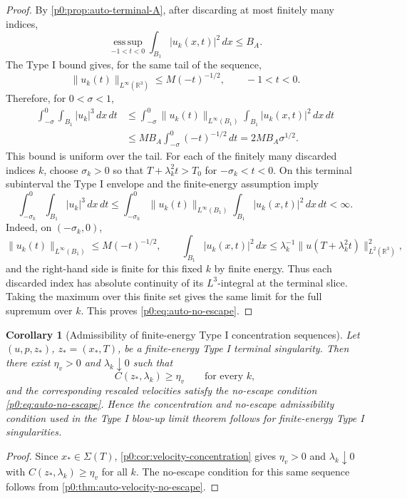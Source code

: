 \documentclass[11pt]{amsart}
\theoremstyle{plain}
\newtheorem{corollary}[corollary]{Corollary}
\theoremstyle{definition}
\theoremstyle{remark}
\numberwithin{equation}{section}
\begin{document}
\begin{proof}
By \cref{p0:prop:auto-terminal-A}, after discarding at most finitely many indices,
\[
  \operatorname*{ess\,sup}_{-1<t<0}\int_{B_1}|u_k(x,t)|^2\,dx\le B_A .
\]
The Type I bound gives, for the same tail of the sequence,
\[
  \|u_k(t)\|_{L^\infty(\mathbb R^3)}
  \le M(-t)^{-1/2},
  \qquad -1<t<0 .
\]
Therefore, for \(0<\sigma<1\),
\[
\begin{aligned}
  \int_{-\sigma}^{0}\int_{B_1}|u_k|^3\,dx\,dt
  &\le
  \int_{-\sigma}^{0}\|u_k(t)\|_{L^\infty(B_1)}
       \int_{B_1}|u_k(x,t)|^2\,dx\,dt  \\
  &\le M B_A\int_{-\sigma}^{0}(-t)^{-1/2}\,dt
   =2M B_A\sigma^{1/2} .
\end{aligned}
\]
This bound is uniform over the tail.  For each of the finitely many discarded
indices \(k\), choose \(\sigma_k>0\) so that
\(T+\lambda_k^2t>T_0\) for \(-\sigma_k<t<0\).  On this terminal subinterval
the Type I envelope and the finite-energy assumption imply
\[
  \int_{-\sigma_k}^{0}\int_{B_1}|u_k|^3\,dx\,dt
  \le
  \int_{-\sigma_k}^{0}\|u_k(t)\|_{L^\infty(B_1)}
       \int_{B_1}|u_k(x,t)|^2\,dx\,dt
  <\infty .
\]
Indeed, on \((-\sigma_k,0)\),
\[
  \|u_k(t)\|_{L^\infty(B_1)}\le M(-t)^{-1/2},
  \qquad
  \int_{B_1}|u_k(x,t)|^2\,dx
  \le \lambda_k^{-1}\|u(T+\lambda_k^2t)\|_{L^2(\mathbb R^3)}^2,
\]
and the right-hand side is finite for this fixed \(k\) by finite energy.
Thus each discarded index has absolute continuity of its \(L^3\)-integral at
the terminal slice.  Taking the maximum over this finite set gives the same
limit for the full supremum over \(k\).  This proves
\eqref{p0:eq:auto-no-escape}.
\end{proof}

\begin{corollary}[Admissibility of finite-energy Type I concentration sequences]
\label{p0:cor:auto-paperI-admissibility}
Let \((u,p,z_*)\), \(z_*=(x_*,T)\), be a finite-energy Type I terminal
singularity.  Then there exist \(\eta_v>0\) and \(\lambda_k\downarrow0\) such
that
\[
  C(z_*,\lambda_k)\ge\eta_v
  \qquad\text{for every }k,
\]
and the corresponding rescaled velocities satisfy the no-escape condition
\eqref{p0:eq:auto-no-escape}.  Hence the concentration and no-escape
admissibility condition used in the Type I blow-up limit theorem
 follows for finite-energy Type I singularities.
\end{corollary}

\begin{proof}
Since \(x_*\in\Sigma(T)\), \cref{p0:cor:velocity-concentration} gives
\(\eta_v>0\) and \(\lambda_k\downarrow0\) with
\(C(z_*,\lambda_k)\ge\eta_v\) for all \(k\).  The no-escape condition for this
same sequence follows from \cref{p0:thm:auto-velocity-no-escape}.
\end{proof}
\end{document}
